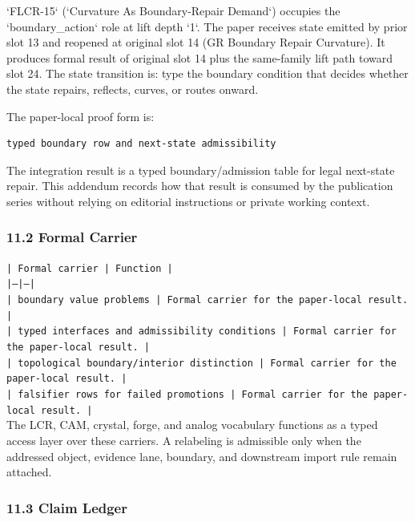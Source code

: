 \documentclass[11pt]{article}
\begin{document}
`FLCR-15` (`Curvature As Boundary-Repair Demand`) occupies the `boundary\_action` role at lift depth `1`.
The paper receives state emitted by prior slot 13 and reopened at original slot 14 (GR Boundary Repair Curvature). It produces formal result of original slot 14 plus the same-family lift path toward slot 24. The state transition is:
type the boundary condition that decides whether the state repairs, reflects, curves, or routes onward.

The paper-local proof form is:

\begin{verbatim}
typed boundary row and next-state admissibility
\end{verbatim}

The integration result is a typed boundary/admission table for legal next-state repair. This addendum records how that result is
consumed by the publication series without relying on editorial instructions or
private working context.

\subsubsection*{11.2 Formal Carrier}

\noindent\texttt{| Formal carrier | Function |}\\
\noindent\texttt{|---|---|}\\
\noindent\texttt{| boundary value problems | Formal carrier for the paper-local result. |}\\
\noindent\texttt{| typed interfaces and admissibility conditions | Formal carrier for the paper-local result. |}\\
\noindent\texttt{| topological boundary/interior distinction | Formal carrier for the paper-local result. |}\\
\noindent\texttt{| falsifier rows for failed promotions | Formal carrier for the paper-local result. |}\\

The LCR, CAM, crystal, forge, and analog vocabulary functions as a typed access
layer over these carriers. A relabeling is admissible only when the addressed
object, evidence lane, boundary, and downstream import rule remain attached.

\subsubsection*{11.3 Claim Ledger}
\end{document}
